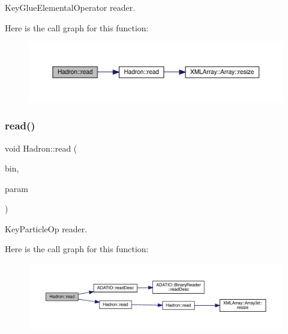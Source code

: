 Key\+Glue\+Elemental\+Operator reader. 

Here is the call graph for this function\+:\nopagebreak
\begin{figure}[H]
\begin{center}
\leavevmode
\includegraphics[width=350pt]{d1/daf/namespaceHadron_a008c27a4777be30324acc6271e059d2e_cgraph}
\end{center}
\end{figure}
\mbox{\label{namespaceHadron_a22ce4d5ec6f9bf7a3504cb4b7b176c78}} 
\subsubsection{\texorpdfstring{read()}{read()}\hspace{0.1cm}{\footnotesize\ttfamily [49/94]}}
{\footnotesize\ttfamily void Hadron\+::read (\begin{DoxyParamCaption}\item[{\mbox{\hyperlink{classADATIO_1_1BinaryReader}{Binary\+Reader}} \&}]{bin,  }\item[{\mbox{\hyperlink{structHadron_1_1KeyParticleOp__t}{Key\+Particle\+Op\+\_\+t}} \&}]{param }\end{DoxyParamCaption})}



Key\+Particle\+Op reader. 

Here is the call graph for this function\+:\nopagebreak
\begin{figure}[H]
\begin{center}
\leavevmode
\includegraphics[width=350pt]{d1/daf/namespaceHadron_a22ce4d5ec6f9bf7a3504cb4b7b176c78_cgraph}
\end{center}
\end{figure}
\mbox{\label{namespaceHadron_a48b9ff1049a4c339c032065b538ed41f}} 
